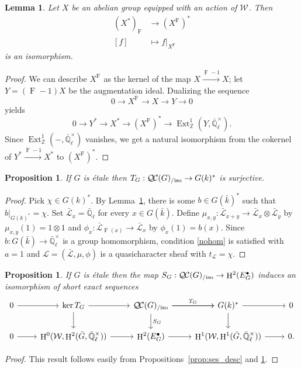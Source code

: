 \documentclass{amsart}
\theoremstyle{plain}
\newtheorem{proposition}[theorem]{Proposition}
\newtheorem{lemma}[theorem]{Lemma}
\theoremstyle{definition}
\theoremstyle{remark}
\newcommand{\ZZ}{{\mathbb{Z}}}
\newcommand{\EE}{\mathbb{\bar Q}_\ell}
\newcommand{\bFq}{\bar{k}}
\newcommand{\Fq}{k}
\newcommand{\EEx}{\EE^\times}
\newcommand{\Weil}[1]{\mathcal{W}_{#1}}
\newcommand{\Frob}[1]{\operatorname{F}_{#1}}
\DeclareMathOperator{\Ext}{Ext}
\DeclareMathOperator{\Hh}{H}
\newcommand{\qcs}[1]{{\mathcal{#1}}}
\newcommand{\gqcs}[1]{{\mathcal{\bar #1}}}
\newcommand{\QC}{{\mathcal{Q\hskip-0.8pt C}}}
\newcommand{\QCiso}[1]{\QC(#1)_{/\text{iso}}}
\newcommand{\trFrob}[1]{t_{#1}}
\newcommand{\TrFrob}[1]{T_{#1}}
\begin{document}
\begin{lemma} \label{lem:dual-inv}
Let $X$ be an abelian group equipped with an action of $\Weil{}$.
 Then
\begin{align*}
 (X^*)_{\Frob{}} &\to (X^{\Frob{}})^* \\
 [f] &\mapsto f|_{X^{\Frob{}}}
\end{align*}
is an isomorphism.
\end{lemma}

\begin{proof}
We can describe $X^{\Frob{}}$ as the kernel of the map $X \xrightarrow{\Frob{}-1} X$;
let $Y = (\Frob{}-1)X$ be the augmentation ideal.  Dualizing the sequence
\[
 0 \to X^{\Frob{}} \to X \to Y \to 0
\]
yields
\[
 0 \to Y^* \to X^* \to (X^{\Frob{}})^* \to \Ext^1_\ZZ(Y, \EEx).
\]
Since $\Ext^1_\ZZ(-,\EEx)$ vanishes, we get a natural isomorphism from the cokernel of $Y^* \xrightarrow{\Frob{}-1} X^*$ to $(X^{\Frob{}})^*$.
\end{proof}

\begin{proposition}\label{prop:sur_etale}
If $G$ is \'etale then $\TrFrob{G} : \QCiso{G} \to G(\Fq)^*$ is surjective.
\end{proposition}
\begin{proof}
Pick $\chi \in G(\Fq)^*$.
By Lemma~\ref{lem:dual-inv}, there is some $b\in G(\bFq)^*$ such that $b\vert_{G(\Fq)^*} = \chi$.
Set $\gqcs{L}_x = \EE$ for every $x\in G(\bFq)$.
Define $\mu_{x,y} : \gqcs{L}_{x+y} \to \gqcs{L}_x\otimes \gqcs{L}_y$ by $\mu_{x,y}(1) = 1 \otimes 1$ and
$\phi_{x} : \gqcs{L}_{\Frob{}(x)} \to \gqcs{L}_x$ by $\phi_{x}(1) = b(x)$.
Since $b : G(\bFq) \to \EEx$ is a group homomorphism,
condition \eqref{nohom} is satisfied with $a =1$ and $\qcs{L} = (\gqcs{L}, \mu, \phi)$
is a quasicharacter sheaf with $\trFrob{\qcs{L}} = \chi$.
\end{proof}



\begin{proposition} \label{prop:etale-iso}
 If $G$ is \'etale then the map $S_G : \QCiso{G}\to \Hh^2(E^\bullet_G)$ induces an isomorphism of short exact sequences
\[
\begin{tikzcd}
 0 \arrow{r} & \ker \TrFrob{G} \arrow{d} \arrow{r} & \QCiso{G}\arrow{d}{S_G} \arrow{r}{\TrFrob{G}} \arrow{r} & G(\Fq)^* \arrow{d} \arrow{r} & 0\\
  0 \arrow{r} & \Hh^0(\Weil{},\Hh^2({\bar G},\EEx)) \arrow{r} & \Hh^2(E^\bullet_G) \arrow{r} & \Hh^1(\Weil{},\Hh^1({\bar G},\EEx)) \arrow{r} & 0.
 \end{tikzcd}
 \]
\end{proposition}
\begin{proof}
This result follows easily from Propositions~\ref{prop:ses_desc} and \ref{prop:sur_etale}.
\end{proof}
\end{document}
